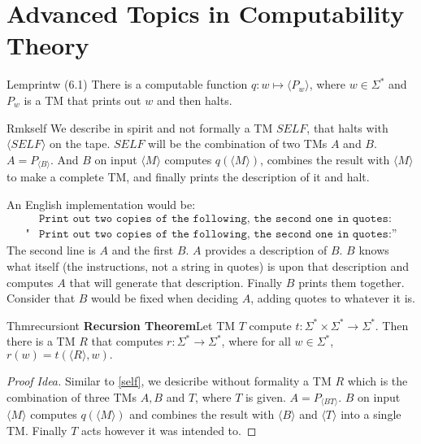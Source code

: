 \chapter{Advanced Topics in Computability Theory}

\begin{reference}{Lem}{printw}
  (6.1) There is a computable function $q:w\mapsto\langle P_w\rangle$, where $w\in \Sigma^*$ and $P_w$ is a TM that prints out $w$ and then halts.
\end{reference}

\begin{reference}{Rmk}{self}
  We describe in spirit and not formally a TM $\textit{SELF}$, that halts with $\langle \textit{SELF}\rangle$ on the tape. $\textit{SELF}$ will be the combination of two TMs $A$ and $B$. $A=P_{\langle B\rangle}$. And $B$ on input $\langle M\rangle$ computes $q(\langle M\rangle)$, combines the result with $\langle M\rangle$ to make a complete TM, and finally prints the description of it and halt.
\end{reference}

An English implementation would be:
\begin{align*}
             & \texttt{Print out two copies of the following, the second one in quotes:}  \\
  \texttt{"} & \texttt{Print out two copies of the following, the second one in quotes:”}
\end{align*}
The second line is $A$ and the first $B$. $A$ provides a description of $B$. $B$ knows what itself (the instructions, not a string in quotes) is upon that description and computes $A$ that will generate that description. Finally $B$ prints them together. Consider that $B$ would be fixed when deciding $A$, adding quotes to whatever it is.

\begin{reference}{Thm}{recursiont}
  \textbf{Recursion Theorem}\quad Let TM $T$ compute $t:\Sigma^*\times \Sigma^*\to \Sigma^*$. Then there is a TM $R$ that computes $r:\Sigma^*\to \Sigma^*$, where for all $w\in \Sigma^*$, $r(w)=t(\langle R\rangle, w).$
\end{reference}

\begin{proof}[Proof Idea]
  Similar to \ref{self}, we desicribe without formality a TM $R$ which is the combination of three TMs $A,B$ and $T$, where $T$ is given. $A=P_{\langle BT\rangle}$. $B$ on input $\langle M\rangle$ computes $q(\langle M\rangle)$ and combines the result with $\langle B\rangle$ and $\langle T\rangle$ into a single TM. Finally $T$ acts however it was intended to.
\end{proof}

